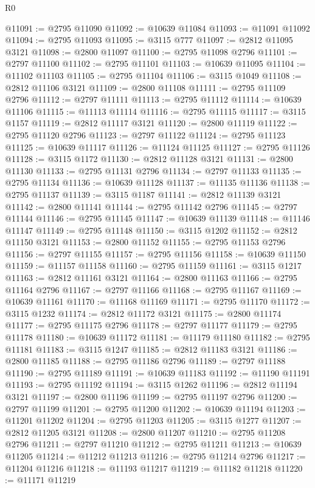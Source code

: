 \begin{lexlean}{R0}
\begin{coremodule}
@11091 := @2795 @11090
@11092 := @10639 @11084
@11093 := @11091 @11092
@11094 := @2795 @11093
@11095 := @3115 @777
@11097 := @2812 @11095 @3121
@11098 := @2800 @11097
@11100 := @2795 @11098 @2796
@11101 := @2797 @11100
@11102 := @2795 @11101
@11103 := @10639 @11095
@11104 := @11102 @11103
@11105 := @2795 @11104
@11106 := @3115 @1049
@11108 := @2812 @11106 @3121
@11109 := @2800 @11108
@11111 := @2795 @11109 @2796
@11112 := @2797 @11111
@11113 := @2795 @11112
@11114 := @10639 @11106
@11115 := @11113 @11114
@11116 := @2795 @11115
@11117 := @3115 @1157
@11119 := @2812 @11117 @3121
@11120 := @2800 @11119
@11122 := @2795 @11120 @2796
@11123 := @2797 @11122
@11124 := @2795 @11123
@11125 := @10639 @11117
@11126 := @11124 @11125
@11127 := @2795 @11126
@11128 := @3115 @1172
@11130 := @2812 @11128 @3121
@11131 := @2800 @11130
@11133 := @2795 @11131 @2796
@11134 := @2797 @11133
@11135 := @2795 @11134
@11136 := @10639 @11128
@11137 := @11135 @11136
@11138 := @2795 @11137
@11139 := @3115 @1187
@11141 := @2812 @11139 @3121
@11142 := @2800 @11141
@11144 := @2795 @11142 @2796
@11145 := @2797 @11144
@11146 := @2795 @11145
@11147 := @10639 @11139
@11148 := @11146 @11147
@11149 := @2795 @11148
@11150 := @3115 @1202
@11152 := @2812 @11150 @3121
@11153 := @2800 @11152
@11155 := @2795 @11153 @2796
@11156 := @2797 @11155
@11157 := @2795 @11156
@11158 := @10639 @11150
@11159 := @11157 @11158
@11160 := @2795 @11159
@11161 := @3115 @1217
@11163 := @2812 @11161 @3121
@11164 := @2800 @11163
@11166 := @2795 @11164 @2796
@11167 := @2797 @11166
@11168 := @2795 @11167
@11169 := @10639 @11161
@11170 := @11168 @11169
@11171 := @2795 @11170
@11172 := @3115 @1232
@11174 := @2812 @11172 @3121
@11175 := @2800 @11174
@11177 := @2795 @11175 @2796
@11178 := @2797 @11177
@11179 := @2795 @11178
@11180 := @10639 @11172
@11181 := @11179 @11180
@11182 := @2795 @11181
@11183 := @3115 @1247
@11185 := @2812 @11183 @3121
@11186 := @2800 @11185
@11188 := @2795 @11186 @2796
@11189 := @2797 @11188
@11190 := @2795 @11189
@11191 := @10639 @11183
@11192 := @11190 @11191
@11193 := @2795 @11192
@11194 := @3115 @1262
@11196 := @2812 @11194 @3121
@11197 := @2800 @11196
@11199 := @2795 @11197 @2796
@11200 := @2797 @11199
@11201 := @2795 @11200
@11202 := @10639 @11194
@11203 := @11201 @11202
@11204 := @2795 @11203
@11205 := @3115 @1277
@11207 := @2812 @11205 @3121
@11208 := @2800 @11207
@11210 := @2795 @11208 @2796
@11211 := @2797 @11210
@11212 := @2795 @11211
@11213 := @10639 @11205
@11214 := @11212 @11213
@11216 := @2795 @11214 @2796
@11217 := @11204 @11216
@11218 := @11193 @11217
@11219 := @11182 @11218
@11220 := @11171 @11219

\end{coremodule}
\end{lexlean}
